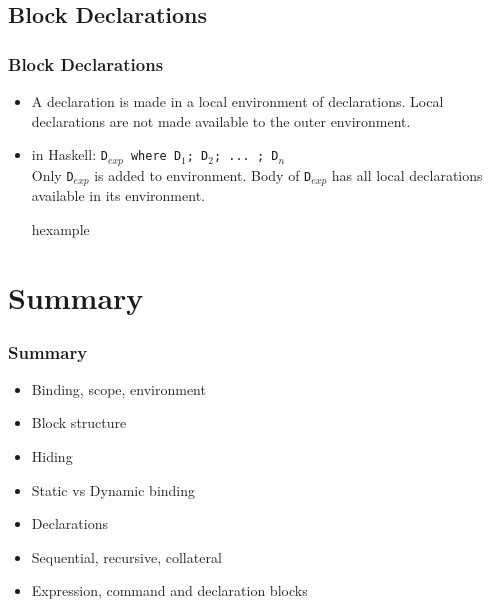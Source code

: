 \subsection{Block Declarations}
\begin{frame}
\frametitle{Block Declarations}
\begin{itemize}
 \item A declaration is made in a local environment of declarations. Local declarations
 	are not made available to the outer environment.
 \item in Haskell: \texttt{D$_{exp}$ where D$_1$; D$_2$;  ... ; D$_n$}\\
 	Only \texttt{D$_{exp}$} is added to environment. Body of \texttt{D$_{exp}$} has all local
	declarations available in its environment.
\begin{beamercolorbox}{hexample}
 \codeblokdecH
\end{beamercolorbox}
\end{itemize}
\end{frame}

\section{Summary}
\begin{frame}
\frametitle{Summary}
\begin{itemize}
\item Binding, scope, environment
\item Block structure
\item Hiding
\item Static vs Dynamic binding
\item Declarations
\item Sequential, recursive, collateral
\item Expression, command and declaration blocks
\end{itemize}
\end{frame}

